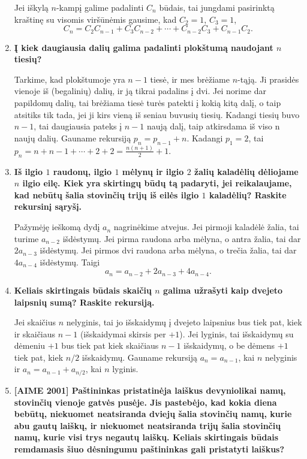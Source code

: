 \begin{enumerate}
Jei iškylą $n$-kampį galime padalinti $C_n$ būdais, tai jungdami pasirinktą kraštinę su visomis viršūnėmis gausime, kad $C_2 = 1$, $C_3 = 1$, $$C_n = C_2C_{n-1} + C_3C_{n-2} + \cdots + C_{n-2}C_3 + C_{n-1}C_2.$$\medskip

\item {\bf Į kiek daugiausia dalių galima padalinti plokštumą naudojant $n$ tiesių?}

Tarkime, kad plokštumoje yra $n-1$ tiesė, ir mes brėžiame $n$-tąją. Ji prasidės vienoje iš (begalinių) dalių, ir ją tikrai padalins į dvi. Jei norime dar papildomų dalių, tai brėžiama tiesė turės patekti į kokią kitą dalį, o taip atsitiks tik tada, jei ji kirs vieną iš seniau buvusių tiesių. Kadangi tiesių buvo $n-1$, tai daugiausia pateks į $n-1$ naują dalį, taip atkirsdama iš viso n naujų dalių. Gauname rekursiją $p_n = p_{n-1} + n$. Kadangi $p_1 = 2$, tai $p_n = n + n-1 + \cdots + 2 + 2 = \frac{n(n+1)}{2} +1.$   \medskip

\item {\bf Iš ilgio $1$ raudonų, ilgio $1$ mėlynų ir ilgio $2$ žalių kaladėlių dėliojame $n$ ilgio eilę. Kiek yra skirtingų būdų tą padaryti, jei reikalaujame, kad nebūtų šalia stovinčių trijų iš eilės ilgio $1$ kaladėlių? Raskite rekursinį sąryšį.}

Pažymėję ieškomą dydį $a_n$ nagrinėkime atvejus. Jei pirmoji kaladėlė žalia, tai turime $a_{n-2}$ išdėstymų. Jei pirma raudona arba mėlyna, o antra žalia, tai dar $2a_{n-3}$ išdėstymų. Jei pirmos dvi raudona arba mėlyna, o trečia žalia, tai dar $4a_{n-4}$ išdėstymų. Taigi $$a_n = a_{n-2} + 2a_{n-3} + 4a_{n-4}.$$ 


\item {\bf Keliais skirtingais būdais skaičių $n$ galima užrašyti kaip dvejeto laipsnių sumą? Raskite rekursiją.}

Jei skaičius $n$ nelyginis, tai jo išskaidymų į dvejeto laipsnius bus tiek pat, kiek ir skaičiaus $n-1$ (išskaidymai skirsis per $+1$). Jei lyginis, tai išskaidymų su dėmeniu $+1$ bus tiek pat kiek skaičiaus $n-1$ išskaidymų, o be dėmens $+1$ tiek pat, kiek $n/2$ išskaidymų. Gauname rekursiją $a_n = a_{n-1}$, kai $n$ nelyginis ir $a_{n} = a_{n-1} + a_{n/2}$, kai $n$ lyginis.\medskip

\item {\bf [AIME 2001] Paštininkas pristatinėja laiškus devyniolikai namų, stovinčių vienoje gatvės pusėje. Jis pastebėjo, kad kokia diena bebūtų, niekuomet neatsiranda dviejų šalia stovinčių namų, kurie abu gautų laiškų, ir niekuomet neatsiranda trijų šalia stovinčių namų, kurie visi trys negautų laiškų. Keliais skirtingais būdais remdamasis šiuo dėsningumu paštininkas gali pristatyti laiškus?}


\end{enumerate}
